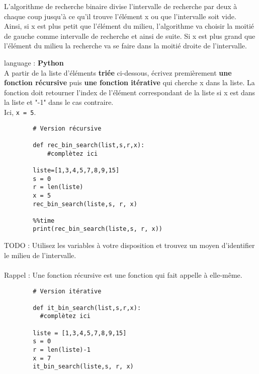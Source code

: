 L'algorithme de recherche binaire divise l'intervalle de recherche par deux à chaque coup jusqu'à ce qu'il trouve l'élément x ou que l'intervalle soit vide.\\

Ainsi, si x est plus petit que l'élément du milieu, l'algorithme va choisir la moitié de gauche comme intervalle de recherche et ainsi de suite. Si x est plus grand que l'élément du milieu la recherche va se faire dans la moitié droite de l'intervalle.\\
   
\begin{Exercice}[10-15 minutes] language : \textbf{Python}\\

A partir de la liste d'éléments \textbf{triée} ci-dessous, écrivez premièrement \textbf{une fonction récursive} puis \textbf{une fonction itérative} qui cherche x dans la liste. La fonction doit retourner l'index de l'élément correspondant de la liste si x est dans la liste et "-1" dans le cas contraire.\\
Ici, \lstinline{x = 5}.\\

    \begin{lstlisting}
        # Version récursive
        
        def rec_bin_search(list,s,r,x):
            #complètez ici 
        
        liste=[1,3,4,5,7,8,9,15]
        s = 0
        r = len(liste)
        x = 5
        rec_bin_search(liste,s, r, x)
     
        %%time
        print(rec_bin_search(liste,s, r, x))
    \end{lstlisting}


    \begin{conseil}
        TODO : Utilisez les variables à votre disposition et trouvez un moyen d'identifier le milieu de l'intervalle.\\\\
        Rappel : Une fonction récursive est une fonction qui fait appelle à elle-même.
    \end{conseil}
    
    
    \begin{lstlisting}
        # Version itérative
        
        def it_bin_search(list,s,r,x):
          #complètez ici
          
        liste = [1,3,4,5,7,8,9,15]
        s = 0
        r = len(liste)-1
        x = 7
        it_bin_search(liste,s, r, x)
        

\end{lstlisting}
\end{Exercice}
